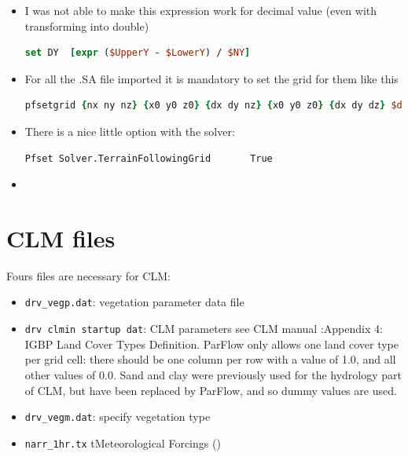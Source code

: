\documentclass[11pt,a4paper]{report}
\begin{document}
\begin{itemize}
\item I was not able to make this expression work for decimal value (even with transforming into double)
\begin{lstlisting}[language=TCL]
set DY	[expr ($UpperY - $LowerY) / $NY]
\end{lstlisting}

\item For all the .SA file imported it is mandatory to set the grid for them like this
\begin{lstlisting}[language=TCL]
pfsetgrid {nx ny nz} {x0 y0 z0} {dx dy nz} {x0 y0 z0} {dx dy dz} $dem
\end{lstlisting}

\item There is a nice little option with the solver: 
\begin{lstlisting}[language=TCL]
Pfset Solver.TerrainFollowingGrid		True
\end{lstlisting}






\item 	
\end{itemize}

\section{CLM files}
Fours files are necessary for CLM:
\begin{itemize}
	\item \verb$drv_vegp.dat$: vegetation parameter data file 
	\item \verb$drv clmin startup dat$: CLM parameters see CLM manual :Appendix 4: IGBP Land Cover Types Definition. ParFlow only allows one land cover type per grid cell: there should be one column per row with a value of 1.0, and all other values of 0.0. Sand and clay were previously used for the hydrology part of CLM, but have been replaced by ParFlow, and so dummy values are used. 
	\item \verb$drv_vegm.dat$: specify vegetation type 
	\item \verb$narr_1hr.tx$ tMeteorological Forcings ()
\end{itemize}

	
	
\end{document}
